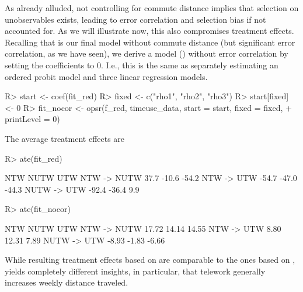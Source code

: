 \documentclass[%
    twoside, openright, titlepage, numbers=noenddot,%
    cleardoublepage=empty,%
    abstract=false,%
    BCOR=5.5mm, paper=a5, fontsize=10pt,%
]{scrreprt}
\begin{document}
As already alluded, not controlling for commute distance implies that selection on unobservables exists, leading to error correlation and selection bias if not accounted for. As we will illustrate now, this also compromises treatment effects. Recalling that  is our final model without commute distance (but significant error correlation, as we have seen), we derive a model () without error correlation by setting the  coefficients to 0. I.e., this is the same as separately estimating an ordered probit model and three linear regression models.
%
\begin{Schunk}
\begin{Sinput}
R> start <- coef(fit_red)
R> fixed <- c("rho1", "rho2", "rho3")
R> start[fixed] <- 0
R> fit_nocor <- opsr(f_red, timeuse_data, start = start, fixed = fixed,
+    printLevel = 0)
\end{Sinput}
\end{Schunk}
%
The average treatment effects are
%
\begin{Schunk}
\begin{Sinput}
R> ate(fit_red)
\end{Sinput}
\begin{Soutput}
              NTW  NUTW   UTW
NTW -> NUTW  37.7 -10.6 -54.2
NTW -> UTW  -54.7 -47.0 -44.3
NUTW -> UTW -92.4 -36.4   9.9
\end{Soutput}
\begin{Sinput}
R> ate(fit_nocor)
\end{Sinput}
\begin{Soutput}
              NTW  NUTW   UTW
NTW -> NUTW 17.72 14.14 14.55
NTW -> UTW   8.80 12.31  7.89
NUTW -> UTW -8.93 -1.83 -6.66
\end{Soutput}
\end{Schunk}
%
While resulting treatment effects based on  are comparable to the ones based on ,  yields completely different insights, in particular, that telework generally increases weekly distance traveled.
\end{document}
